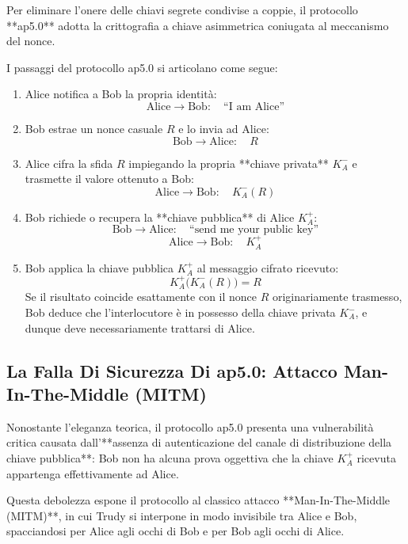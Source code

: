 \documentclass[11pt, a4paper]{article}
\begin{document}
Per eliminare l'onere delle chiavi segrete condivise a coppie, il protocollo **ap5.0** adotta la crittografia a chiave asimmetrica coniugata al meccanismo del nonce.


I passaggi del protocollo ap5.0 si articolano come segue:
\begin{enumerate}[leftmargin=*]
    \item Alice notifica a Bob la propria identità:
    \[
    \text{Alice} \longrightarrow \text{Bob}: \quad \text{``I am Alice''}
    \]
    \item Bob estrae un nonce casuale $R$ e lo invia ad Alice:
    \[
    \text{Bob} \longrightarrow \text{Alice}: \quad R
    \]
    \item Alice cifra la sfida $R$ impiegando la propria **chiave privata** $K_A^-$ e trasmette il valore ottenuto a Bob:
    \[
    \text{Alice} \longrightarrow \text{Bob}: \quad K_A^-(R)
    \]
    \item Bob richiede o recupera la **chiave pubblica** di Alice $K_A^+$:
    \[
    \text{Bob} \longrightarrow \text{Alice}: \quad \text{``send me your public key''}
    \]
    \[
    \text{Alice} \longrightarrow \text{Bob}: \quad K_A^+
    \]
    \item Bob applica la chiave pubblica $K_A^+$ al messaggio cifrato ricevuto:
    \[
    K_A^+\bigl(K_A^-(R)\bigr) = R
    \]
    Se il risultato coincide esattamente con il nonce $R$ originariamente trasmesso, Bob deduce che l'interlocutore è in possesso della chiave privata $K_A^-$, e dunque deve necessariamente trattarsi di Alice.
\end{enumerate}

\subsection{La Falla Di Sicurezza Di ap5.0: Attacco Man-In-The-Middle (MITM)}

Nonostante l'eleganza teorica, il protocollo ap5.0 presenta una vulnerabilità critica causata dall'**assenza di autenticazione del canale di distribuzione della chiave pubblica**: Bob non ha alcuna prova oggettiva che la chiave $K_A^+$ ricevuta appartenga effettivamente ad Alice.

Questa debolezza espone il protocollo al classico attacco **Man-In-The-Middle (MITM)**, in cui Trudy si interpone in modo invisibile tra Alice e Bob, spacciandosi per Alice agli occhi di Bob e per Bob agli occhi di Alice.
\end{document}
